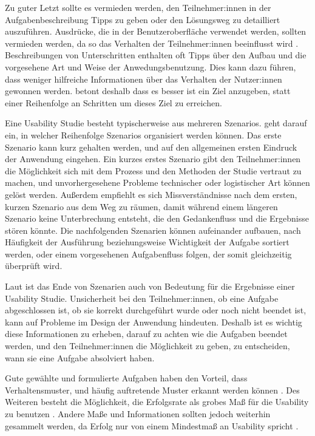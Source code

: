 Zu guter Letzt sollte es vermieden werden, den Teilnehmer:innen in der Aufgabenbeschreibung Tipps zu
geben oder den Lösungsweg zu detailliert auszuführen. Ausdrücke, die in der Benutzeroberfläche
verwendet werden, sollten vermieden werden, da so das Verhalten der Teilnehmer:innen beeinflusst
wird \parencite{mccloskeyTaskScenarios2014, barnumUsabilityTesting2021}. Beschreibungen von
Unterschritten enthalten oft Tipps über den Aufbau und die vorgesehene Art und Weise der
Anwedungsbenutzung. Dies kann dazu führen, dass weniger hilfreiche Informationen über das Verhalten
der Nutzer:innen gewonnen werden. \textcite{barnumUsabilityTesting2021} betont deshalb dass es
besser ist ein Ziel anzugeben, statt einer Reihenfolge an Schritten um dieses Ziel zu erreichen.
\parencite{mccloskeyTaskScenarios2014}

Eine Usability Studie besteht typischerweise aus mehreren Szenarios.
\textcite{barnumUsabilityTesting2021} geht darauf ein, in welcher Reihenfolge Szenarios organisiert
werden können. Das erste Szenario kann kurz gehalten werden, und auf den allgemeinen ersten Eindruck
der Anwendung eingehen. Ein kurzes erstes Szenario gibt den Teilnehmer:innen die Möglichkeit sich
mit dem Prozess und den Methoden der Studie vertraut zu machen, und unvorhergesehene Probleme
technischer oder logistischer Art können gelöst werden. Außerdem empfiehlt es sich Missverständnisse
nach dem ersten, kurzen Szenario aus dem Weg zu räumen, damit während einem längeren Szenario keine
Unterbrechung entsteht, die den Gedankenfluss und die Ergebnisse stören könnte. Die nachfolgenden
Szenarien können aufeinander aufbauen, nach Häufigkeit der Ausführung beziehungsweise Wichtigkeit
der Aufgabe sortiert werden, oder einem vorgesehenen Aufgabenfluss folgen, der somit gleichzeitig
überprüft wird.
\parencite{barnumUsabilityTesting2021}

Laut \textcite{barnumUsabilityTesting2021} ist das Ende von Szenarien auch von Bedeutung für die
Ergebnisse einer Usability Studie. Unsicherheit bei den Teilnehmer:innen, ob eine Aufgabe
abgeschlossen ist, ob sie korrekt durchgeführt wurde oder noch nicht beendet ist, kann auf Probleme
im Design der Anwendung hindeuten. Deshalb ist es wichtig diese Informationen zu erheben, darauf zu
achten wie die Aufgaben beendet werden, und den Teilnehmer:innen die Möglichkeit zu geben, zu
entscheiden, wann sie eine Aufgabe absolviert haben.
\parencite{barnumUsabilityTesting2021}

Gute gewählte und formulierte Aufgaben haben den Vorteil, dass Verhaltensmuster, und häufig
auftretende Muster erkannt werden können \parencite{barnumUsabilityTesting2021}. Des Weiteren
besteht die Möglichkeit, die Erfolgsrate als grobes Maß für die Usability zu benutzen
\parencite{nielsenSuccessRate2001}. Andere Maße und Informationen sollten jedoch weiterhin gesammelt
werden, da Erfolg nur von einem Mindestmaß an Usability spricht \parencite{nielsenSuccessRate2001}.
